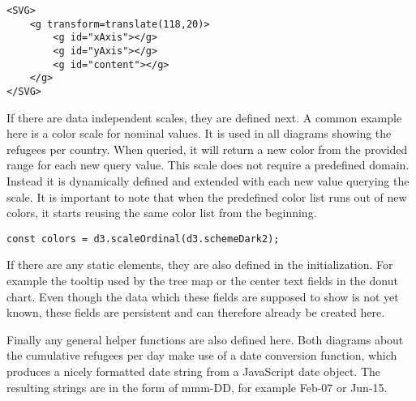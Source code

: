 \begin{minipage}{0.9\linewidth}
\begin{lstlisting}[style=htmlCSSjs, captionpos=b, caption={The HTML structure which results from the JavaScript code in listing \ref{lst:hierarchy_creation}. The resulting tree structure clearly separates the different aspects of the diagram. Using a hierarchical approach makes not only later selections easier, but also increases human readability and simplifies debugging.}, label={lst:hierarchy_result}]
<SVG>
    <g transform=translate(118,20)>
        <g id="xAxis"></g>
        <g id="yAxis"></g>
        <g id="content"></g>
    </g>
</SVG>
    \end{lstlisting}
\end{minipage}

If there are data independent scales, they are defined next. A common example here is a color scale for nominal values. It is used in all diagrams showing the refugees per country. When queried, it will return a new color from the provided range for each new query value. This scale does not require a predefined domain. Instead it is dynamically defined and extended with each new value querying the scale. It is important to note that when the predefined color list runs out of new colors, it starts reusing the same color list from the beginning.

\begin{minipage}{0.9\linewidth}
    \begin{lstlisting}[style=htmlCSSjs, captionpos=b, caption={Definition of the data independent color scale. \texttt{d3.schemeDarkv2} is a predefined list of color values which is  used as the range of the scale.}, label={color_scale}]
const colors = d3.scaleOrdinal(d3.schemeDark2);
    \end{lstlisting}
\end{minipage}

If there are any static elements, they are also defined in the initialization. For example the tooltip used by the tree map or the center text fields in the donut chart. Even though the data which these fields are supposed to show is not yet known, these fields are persistent and can therefore already be created here.

Finally any general helper functions are also defined here. Both diagrams about the cumulative refugees per day make use of a date conversion function, which produces a nicely formatted date string from a JavaScript date object. The resulting strings are in the form of mmm-DD, for example Feb-07 or Jun-15.

